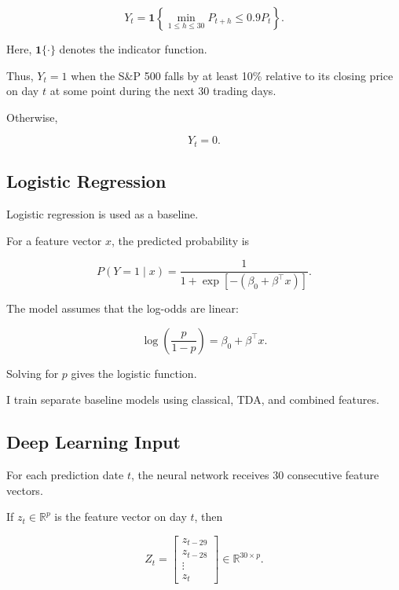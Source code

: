 \documentclass[oneside,english,11pt]{article}
\renewcommand{\boxed}[1]{#1}
\begin{document}
\begin{equation}
\boxed{
Y_t=
\mathbf{1}
\left\{
\min_{1\leq h\leq30}
P_{t+h}
\leq0.9P_t
\right\}.
}
\end{equation}

Here, $\mathbf{1}\{\cdot\}$ denotes the
indicator function.

Thus, $Y_t=1$ when the S\&P 500 falls
by at least 10\% relative to its closing
price on day $t$ at some point during
the next 30 trading days.

Otherwise,

\begin{equation}
Y_t=0.
\end{equation}

\subsection{Logistic Regression}

Logistic regression is used as a baseline.

For a feature vector $x$, the predicted
probability is

\begin{equation}
\boxed{
P(Y=1\mid x)
=
\frac{1}{
1+\exp[-(\beta_0+\beta^\top x)]
}.
}
\end{equation}

The model assumes that the log-odds are linear:

\begin{equation}
\log\left(
\frac{p}{1-p}
\right)
=
\beta_0+\beta^\top x.
\end{equation}

Solving for $p$ gives the logistic function.

I train separate baseline models using
classical, TDA, and combined features.

\subsection{Deep Learning Input}

For each prediction date $t$, the neural network
receives 30 consecutive feature vectors.

If $z_t\in\mathbb{R}^{p}$ is the feature vector
on day $t$, then

\begin{equation}
\boxed{
Z_t=
\begin{bmatrix}
z_{t-29}\\
z_{t-28}\\
\vdots\\
z_t
\end{bmatrix}
\in\mathbb{R}^{30\times p}.
}
\end{equation}
\end{document}
